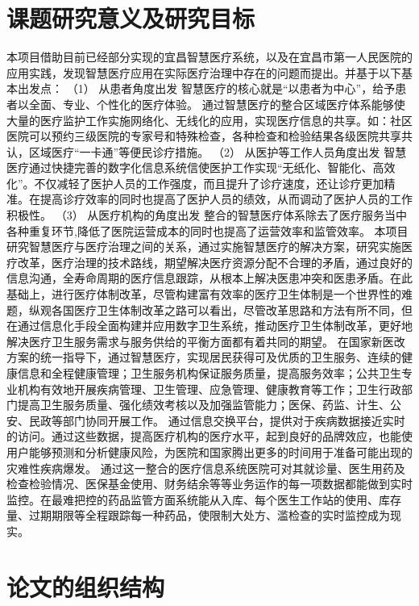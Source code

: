 \documentclass[doctor,secret]{thuthesis}
\begin{document}
\section{课题研究意义及研究目标}
\label{sec:orgf9f33d1}
本项目借助目前已经部分实现的宜昌智慧医疗系统，以及在宜昌市第一人民医院的应用实践，发现智慧医疗应用在实际医疗治理中存在的问题而提出。并基于以下基本出发点：
（1）	从患者角度出发
智慧医疗的核心就是“以患者为中心”，给予患者以全面、专业、个性化的医疗体验。
通过智慧医疗的整合区域医疗体系能够使大量的医疗监护工作实施网络化、无线化的应用，实现医疗信息的共享。如：社区医院可以预约三级医院的专家号和特殊检查，各种检查和检验结果各级医院共享共认，区域医疗“一卡通”等便民诊疗措施。
（2）	从医护等工作人员角度出发
智慧医疗通过快捷完善的数字化信息系统信使医护工作实现“无纸化、智能化、高效化”。不仅减轻了医护人员的工作强度，而且提升了诊疗速度，还让诊疗更加精准。在提高诊疗效率的同时也提高了医护人员的绩效，从而调动了医护人员的工作积极性。
（3）	从医疗机构的角度出发
整合的智慧医疗体系除去了医疗服务当中各种重复环节,降低了医院运营成本的同时也提高了运营效率和监管效率。
本项目研究智慧医疗与医疗治理之间的关系，通过实施智慧医疗的解决方案，研究实施医疗改革，医疗治理的技术路线，期望解决医疗资源分配不合理的矛盾，通过良好的信息沟通，全寿命周期的医疗信息跟踪，从根本上解决医患冲突和医患矛盾。在此基础上，进行医疗体制改革，尽管构建富有效率的医疗卫生体制是一个世界性的难题，纵观各国医疗卫生体制改革之路可以看出，尽管改革思路和方法有所不同，但在通过信息化手段全面构建并应用数字卫生系统，推动医疗卫生体制改革，更好地解决医疗卫生服务需求与服务供给的平衡方面都有着共同的期望。 
在国家新医改方案的统一指导下，通过智慧医疗，实现居民获得可及优质的卫生服务、连续的健康信息和全程健康管理；卫生服务机构保证服务质量，提高服务效率；公共卫生专业机构有效地开展疾病管理、卫生管理、应急管理、健康教育等工作；卫生行政部门提高卫生服务质量、强化绩效考核以及加强监管能力；医保、药监、计生、公安、民政等部门协同开展工作。
通过信息交换平台，提供对于疾病数据接近实时的访问。通过这些数据，提高医疗机构的医疗水平，起到良好的品牌效应，也能使用户能够预测和分析健康风险，为医院和国家腾出更多的时间用于准备可能出现的灾难性疾病爆发。
通过这一整合的医疗信息系统医院可对其就诊量、医生用药及检查检验情况、医保基金使用、财务结余等等业务运作的每一项数据都能做到实时监控。在最难把控的药品监管方面系统能从入库、每个医生工作站的使用、库存量、过期期限等全程跟踪每一种药品，使限制大处方、滥检查的实时监控成为现实。

\section{论文的组织结构}
\label{sec:org15062a8}
\end{document}
